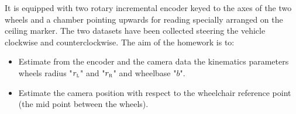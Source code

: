 It is equipped with two rotary incremental encoder keyed to the axes of the two wheels and a chamber pointing upwards for reading specially arranged on the ceiling marker.
The two datasets have been collected steering the vehicle clockwise and counterclockwise.
The aim of the homework is to:
\begin{itemize}
\item Estimate from the encoder and the camera data the kinematics parameters wheels radius "$r_\textsc{l}$" and "$r_\textsc{r}$" and wheelbase "$b$".
\item Estimate the camera position with respect to the wheelchair reference point (the mid point between the wheels).
\end{itemize}